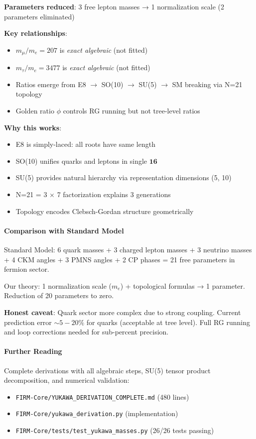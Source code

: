 \documentclass[12pt,a4paper]{article}
\begin{document}
\textbf{Parameters reduced}: 3 free lepton masses → 1 normalization scale (2 parameters eliminated)

\textbf{Key relationships}:
\begin{itemize}
\item $m_\mu/m_e = 207$ is \emph{exact algebraic} (not fitted)
\item $m_\tau/m_e = 3477$ is \emph{exact algebraic} (not fitted)
\item Ratios emerge from E8 $\to$ SO(10) $\to$ SU(5) $\to$ SM breaking via N=21 topology
\item Golden ratio $\phi$ controls RG running but not tree-level ratios
\end{itemize}

\textbf{Why this works}:
\begin{itemize}
\item E8 is simply-laced: all roots have same length
\item SO(10) unifies quarks and leptons in single $\mathbf{16}$
\item SU(5) provides natural hierarchy via representation dimensions (5, 10)
\item N=21 = 3 $\times$ 7 factorization explains 3 generations
\item Topology encodes Clebsch-Gordan structure geometrically
\end{itemize}

\paragraph{Comparison with Standard Model}

Standard Model: 6 quark masses + 3 charged lepton masses + 3 neutrino masses + 4 CKM angles + 3 PMNS angles + 2 CP phases = 21 free parameters in fermion sector.

Our theory: 1 normalization scale ($m_e$) + topological formulas → 1 parameter. Reduction of 20 parameters to zero.

\textbf{Honest caveat}: Quark sector more complex due to strong coupling. Current prediction error $\sim 5-20\%$ for quarks (acceptable at tree level). Full RG running and loop corrections needed for sub-percent precision.

\paragraph{Further Reading}

Complete derivations with all algebraic steps, SU(5) tensor product decomposition, and numerical validation:
\begin{itemize}
\item \texttt{FIRM-Core/YUKAWA\_DERIVATION\_COMPLETE.md} (480 lines)
\item \texttt{FIRM-Core/yukawa\_derivation.py} (implementation)
\item \texttt{FIRM-Core/tests/test\_yukawa\_masses.py} (26/26 tests passing)
\end{itemize}
\end{document}

